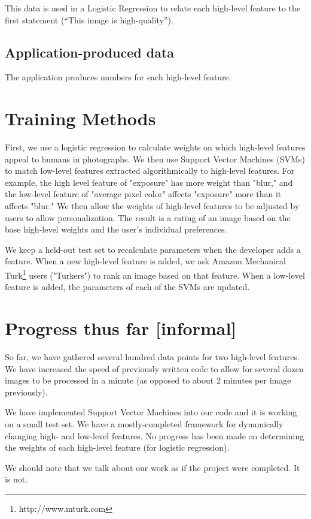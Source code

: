 \documentclass[10pt,twocolumn]{article}
\begin{document}
This data is used in a Logistic Regression to relate each high-level feature to the first statement (``This image is high-quality'').

\subsection{Application-produced data}
The application produces numbers for each high-level feature.

\section{Training Methods}
\label{methods}

First, we use a logistic regression to calculate weights on which high-level features appeal to humans in photographs. We then use Support Vector Machines (SVMs) to match low-level features extracted algorithmically to high-level features. For example, the high level feature of "exposure" has more weight than "blur," and the low-level feature of "average pixel color" affects "exposure" more than it affects "blur." We then allow the weights of high-level features to be adjusted by users to allow personalization. The result is a rating of an image based on the base high-level weights and the user's individual preferences.

We keep a held-out test set to recalculate parameters when the developer adds a feature. When a new high-level feature is added, we ask Amazon Mechanical Turk\footnote{http://www.mturk.com} users ("Turkers") to rank an image based on that feature. When a low-level feature is added, the parameters of each of the SVMs are updated.


\section{Progress thus far [informal]}
So far, we have gathered several hundred data points for two high-level features. We have increased the speed of previously written code to allow for several dozen images to be processed in a minute (as opposed to about 2 minutes per image previously).

We have implemented Support Vector Machines into our code and it is working on a small test set. We have a mostly-completed framework for dynamically changing high- and low-level features. No progress has been made on determining the weights of each high-level feature (for logistic regression).

We should note that we talk about our work as if the project were completed. It is not.
\end{document}
